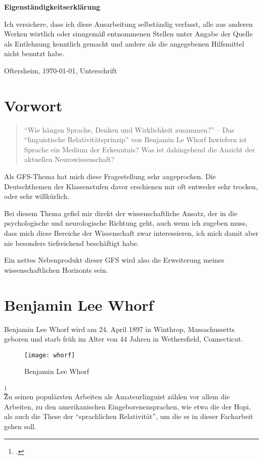 \documentclass[12pt]{scrreprt}
\begin{document}
\makeititle
\begin{center}
	\sffamily\bfseries{Eigenständigkeitserklärung}
\end{center}
Ich versichere, dass ich diese Ausarbeitung selbständig verfasst, alle aus
anderen Werken wörtlich oder sinngemäß entnommenen Stellen unter Angabe der
Quelle als Entlehnung kenntlich gemacht und andere als die angegebenen
Hilfsmittel nicht benutzt habe.

Oftersheim, \today, Unterschrift
\tableofcontents
\listoffigures
\chapter{Vorwort}
	\label{chap:vorwort}
\blockquote{
\enquote{Wie hängen Sprache, Denken und Wirklichkeit
zusammen?} – Das \enquote{linguistische Relativitätsprinzip} von Benjamin Le
Whorf
\medskip\newline
Inwiefern ist Sprache ein Medium der Erkenntnis?
Was ist dahingehend die Ansicht der aktuellen Neurowissenschaft?}
Als GFS-Thema hat mich diese Fragestellung sehr angeprochen.
Die Deutschthemen der Klassenstufen davor erschienen mir oft entweder sehr
trocken, oder sehr willkürlich.

Bei diesem Thema gefiel mir direkt der wissenschaftliche Ansatz, der in die
psychologische und neurologische Richtung geht, auch wenn ich zugeben muss, dass
mich diese Bereiche der Wissenschaft zwar interessieren, ich mich damit aber nie
besonders tiefreichend beschäftigt habe.

Ein nettes Nebenprodukt dieser GFS wird also die Erweiterung meines
wissenschaftlichen Horizonts sein.
\chapter{Benjamin Lee Whorf}
\label{chap:bjwhorf}
Benjamin Lee Whorf wird am 24. April 1897 in Winthrop, Massachussetts geboren
und starb früh im Alter von 44 Jahren in Wethersfield, Connecticut.
\begin{figure}[!htb]
	\centering
	\texttt{[image: whorf]}
	\caption[Benjamin Lee Whorf {\autocite{image:B_L_Whorf}}]{Benjamin Lee Whorf\footnotemark}
	\label{fig:whorf}
\end{figure}
\footcitetext{image:B_L_Whorf}\\
Zu seinen populärsten Arbeiten als Amateurlinguist zählen vor allem die Arbeiten,
zu den amerikanischen Eingeborenensprachen, wie etwa die der Hopi, als auch die
These der \enquote{sprachlichen Relativität}, um die es in dieser Facharbeit
gehen soll.
\end{document}
